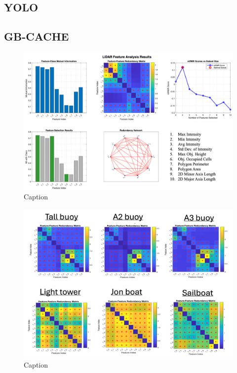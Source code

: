 \documentclass{erauthesis}
\begin{document}
\subsection{YOLO} \label{performance_yolo}


\subsection{GB-CACHE} \label{performance_gbcache}



\begin{figure}
    \centering
    \includegraphics[width=0.95\linewidth]{Images/MI_analysis.png}
    \caption{Caption}
    \label{fig:MI_analysis}
\end{figure}

\begin{figure}
    \centering
    \includegraphics[width=0.95\linewidth]{Images/MI_pairwise.png}
    \caption{Caption}
    \label{fig:MI_pairwise}
\end{figure}
\end{document}
